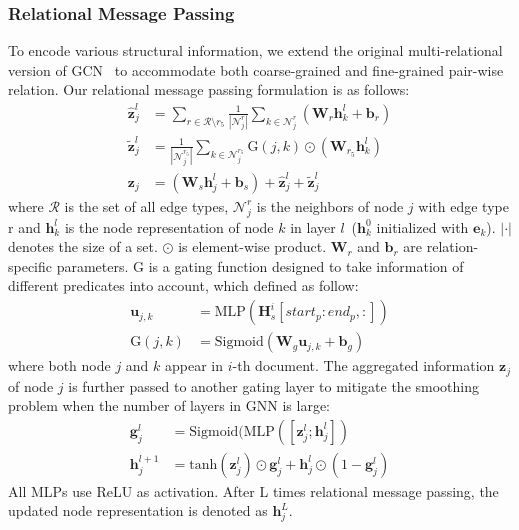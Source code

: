\subsubsection{Relational Message Passing}
To encode various structural information, we extend the original multi-relational version of GCN~\cite{DBLP:journals/corr/KipfW16} to accommodate both coarse-grained and fine-grained pair-wise relation. Our relational message passing formulation is as follows:
\begin{align}
	\hat{\bm{z}}_j^l &= \sum_{r\in \mathcal{R}\setminus r_5}\frac{1}{|\mathcal{N}_j^r|}\sum_{k\in \mathcal{N}_j^r}(\bm{W}_r\bm{h}_k^l+\bm{b}_r) \\
	\tilde{\bm{z}}_j^l &= \frac{1}{|\mathcal{N}_j^{r_5}|}\sum_{k\in \mathcal{N}_j^{r_5}}\text{G}(j,k)\odot(\bm{W}_{r_5}\bm{h}_k^l)  \\ 
	\bm{z}_j &= (\bm{W}_s\bm{h}_j^l+\bm{b}_s) + \hat{\bm{z}}_j^l + \tilde{\bm{z}}_j^l
\end{align}
where $\mathcal{R}$ is the set of all edge types, $\mathcal{N}_j^r$ is the neighbors of node $j$ with edge type r and $\bm{h}_k^l$ is the node representation of node $k$ in layer $l$~($\bm{h}_k^0$ initialized with $\bm{e}_k$).
$|\cdot|$ denotes the size of a set. $\odot$ is element-wise product. $\bm{W}_r$ and $\bm{b}_r$ are relation-specific parameters. G is a gating function designed to take information of different predicates into account, which defined as follow:
\begin{align}
	\bm{u}_{j,k} &= \text{MLP}(\bm{H}_s^i[start_p:end_p,:]) \\
	\text{G}(j,k) &=\text{Sigmoid}(\bm{W}_g\bm{u}_{j,k}+\bm{b}_g) 
\end{align}
where both node $j$ and $k$ appear in $i$-th document. The aggregated information $\bm{z}_j$ of node $j$ is further passed to another gating layer to mitigate the smoothing problem when the number of layers in GNN is large:
\begin{align}
	\bm{g}_j^l &= \text{Sigmoid}(\text{MLP}([\bm{z}_j^l;\bm{h}_j^l]) \\
	\bm{h}_j^{l+1} &= \text{tanh}(\bm{z}_j^l)\odot \bm{g}_j^l + \bm{h}_j^l\odot (1-\bm{g}_j^l)
\end{align}
All MLPs use ReLU as activation. After L times relational message passing, the updated node representation is denoted as $\bm{h}_j^L$.

